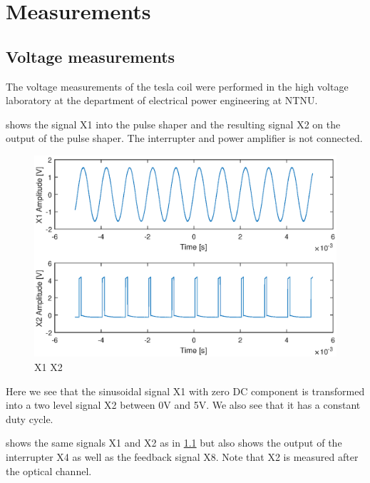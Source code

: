 
\chapter{Measurements}

\section{Voltage measurements}
The voltage measurements of the tesla coil were performed in the high voltage laboratory at the department of electrical power engineering at NTNU.

 shows the signal X1 into the pulse shaper and the resulting signal X2 on the output of the pulse shaper. The interrupter and power amplifier is not connected.

\begin{figure}[H]
    \centering
    \includegraphics[trim={1cm 0cm 1cm 0cm},clip,width=\textwidth]{img/X1-X2.eps}
    \caption{X1 X2}
    \label{fig:m_x1-x2}
\end{figure}

Here we see that the sinusoidal signal X1 with zero DC component is transformed into a two level signal X2 between 0V and 5V. We also see that it has a constant duty cycle.

 shows the same signals X1 and X2 as in \cref{fig:m_x1-x2} but also shows the output of the interrupter X4 as well as the feedback signal X8. Note that X2 is measured after the optical channel.

